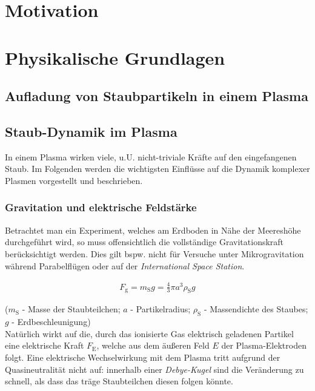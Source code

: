 \documentclass[numbers=noenddot,a4paper]{scrartcl}
\newcommand{\ix}[1]{_\text{#1}}
\newcommand{\tilt}[1]{\textit{#1}}
\begin{document}
	\thispagestyle{empty}
	
	\newpage
	
	\tableofcontents
	
	\newpage
	
	\section{Motivation}\label{sec:einleitung}
	
	\newpage
	
	\section{Physikalische Grundlagen}\label{sec:physg}
	
		\subsection{Aufladung von Staubpartikeln in einem Plasma}\label{subsec:ströme}
	
		\subsection{Staub-Dynamik im Plasma}\label{subsec:dynamik}
		
				In einem Plasma wirken viele, u.U. nicht-triviale Kräfte auf den eingefangenen Staub. Im Folgenden werden die wichtigsten Einflüsse auf die Dynamik komplexer Plasmen vorgestellt und beschrieben.\\
				
				\subsubsection{Gravitation und elektrische Feldstärke}\label{subsub:grav}
				
				Betrachtet man ein Experiment, welches am Erdboden in Nähe der Meereshöhe durchgeführt wird, so muss offensichtlich die vollständige Gravitationskraft berücksichtigt werden. Dies gilt bspw. nicht für Versuche unter Mikrogravitation während Parabelflügen oder auf der \tilt{International Space Station}.
				
					\begin{align}
						F\ix{g}=m\ix{S} g=\frac{4}{3}\pi a^3 \rho\ix{S} g
					\end{align}
				
				($m\ix{S}$ - Masse der Staubteilchen; $a$ - Partikelradius; $\rho\ix{S}$ - Massendichte des Staubes; $g$ - \mbox{Erdbeschleunigung})\\
				Natürlich wirkt auf die, durch das ionisierte Gas elektrisch geladenen Partikel eine elektrische Kraft $F\ix{E}$, welche aus dem äußeren Feld $E$ der Plasma-Elektroden folgt. Eine elektrische Wechselwirkung mit dem Plasma tritt aufgrund der Quasineutralität nicht auf: innerhalb einer \tilt{Debye-Kugel} sind die Veränderung zu schnell, als dass das träge Staubteilchen diesen folgen könnte. 
				
\end{document}
